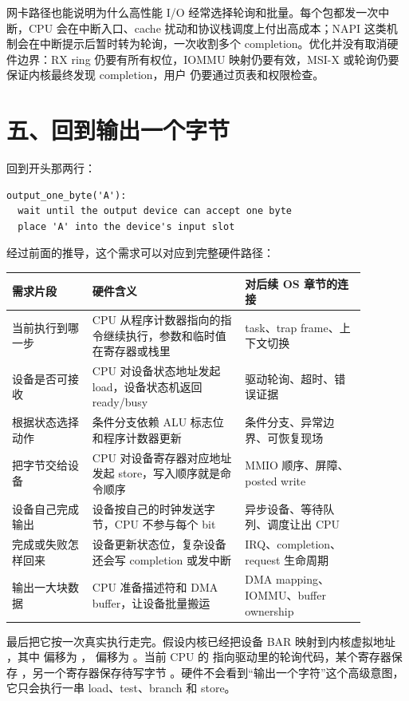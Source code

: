 网卡路径也能说明为什么高性能 I/O 经常选择轮询和批量。每个包都发一次中断，CPU 会在中断入口、cache 扰动和协议栈调度上付出高成本；NAPI 这类机制会在中断提示后暂时转为轮询，一次收割多个 completion。优化并没有取消硬件边界：RX ring 仍要有所有权位，IOMMU 映射仍要有效，MSI-X 或轮询仍要保证内核最终发现 completion，用户  仍要通过页表和权限检查。

\section{五、回到输出一个字节}

回到开头那两行：

\begin{lstlisting}
output_one_byte('A'):
  wait until the output device can accept one byte
  place 'A' into the device's input slot
\end{lstlisting}

经过前面的推导，这个需求可以对应到完整硬件路径：

\begin{longtable}{p{0.2\linewidth}p{0.38\linewidth}p{0.3\linewidth}}
\toprule
需求片段 & 硬件含义 & 对后续 OS 章节的连接 \\
\midrule
当前执行到哪一步 & CPU 从程序计数器指向的指令继续执行，参数和临时值在寄存器或栈里 & task、trap frame、上下文切换 \\
设备是否可接收 & CPU 对设备状态地址发起 load，设备状态机返回 ready/busy & 驱动轮询、超时、错误证据 \\
根据状态选择动作 & 条件分支依赖 ALU 标志位和程序计数器更新 & 条件分支、异常边界、可恢复现场 \\
把字节交给设备 & CPU 对设备寄存器对应地址发起 store，写入顺序就是命令顺序 & MMIO 顺序、屏障、posted write \\
设备自己完成输出 & 设备按自己的时钟发送字节，CPU 不参与每个 bit & 异步设备、等待队列、调度让出 CPU \\
完成或失败怎样回来 & 设备更新状态位，复杂设备还会写 completion 或发中断 & IRQ、completion、request 生命周期 \\
输出一大块数据 & CPU 准备描述符和 DMA buffer，让设备批量搬运 & DMA mapping、IOMMU、buffer ownership \\
\bottomrule
\end{longtable}

最后把它按一次真实执行走完。假设内核已经把设备 BAR 映射到内核虚拟地址 ，其中  偏移为 ， 偏移为 。当前 CPU 的  指向驱动里的轮询代码，某个寄存器保存 ，另一个寄存器保存待写字节 。硬件不会看到“输出一个字符”这个高级意图，它只会执行一串 load、test、branch 和 store。

